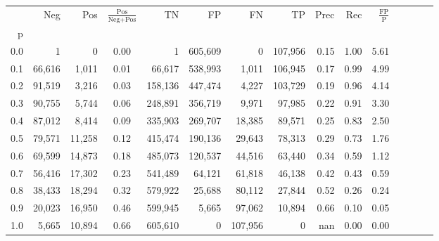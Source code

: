 \begin{tabular}{rrrcrrrrrrrrrrr}
\toprule
{} &     Neg &     Pos & $\frac{\text{Pos}}{\text{Neg}+\text{Pos}}$ &       TN &       FP &       FN &       TP &  Prec &   Rec & $\frac{\text{FP}}{\text{P}}$ \\
p   &         &         &                                            &          &          &          &          &       &       &                              \\
\midrule
0.0 &       1 &       0 &                                       0.00 &        1 &  605,609 &        0 &  107,956 &  0.15 &  1.00 &                         5.61 \\
0.1 &  66,616 &   1,011 &                                       0.01 &   66,617 &  538,993 &    1,011 &  106,945 &  0.17 &  0.99 &                         4.99 \\
0.2 &  91,519 &   3,216 &                                       0.03 &  158,136 &  447,474 &    4,227 &  103,729 &  0.19 &  0.96 &                         4.14 \\
0.3 &  90,755 &   5,744 &                                       0.06 &  248,891 &  356,719 &    9,971 &   97,985 &  0.22 &  0.91 &                         3.30 \\
0.4 &  87,012 &   8,414 &                                       0.09 &  335,903 &  269,707 &   18,385 &   89,571 &  0.25 &  0.83 &                         2.50 \\
0.5 &  79,571 &  11,258 &                                       0.12 &  415,474 &  190,136 &   29,643 &   78,313 &  0.29 &  0.73 &                         1.76 \\
0.6 &  69,599 &  14,873 &                                       0.18 &  485,073 &  120,537 &   44,516 &   63,440 &  0.34 &  0.59 &                         1.12 \\
0.7 &  56,416 &  17,302 &                                       0.23 &  541,489 &   64,121 &   61,818 &   46,138 &  0.42 &  0.43 &                         0.59 \\
0.8 &  38,433 &  18,294 &                                       0.32 &  579,922 &   25,688 &   80,112 &   27,844 &  0.52 &  0.26 &                         0.24 \\
0.9 &  20,023 &  16,950 &                                       0.46 &  599,945 &    5,665 &   97,062 &   10,894 &  0.66 &  0.10 &                         0.05 \\
1.0 &   5,665 &  10,894 &                                       0.66 &  605,610 &        0 &  107,956 &        0 &   nan &  0.00 &                         0.00 \\
\bottomrule
\end{tabular}

